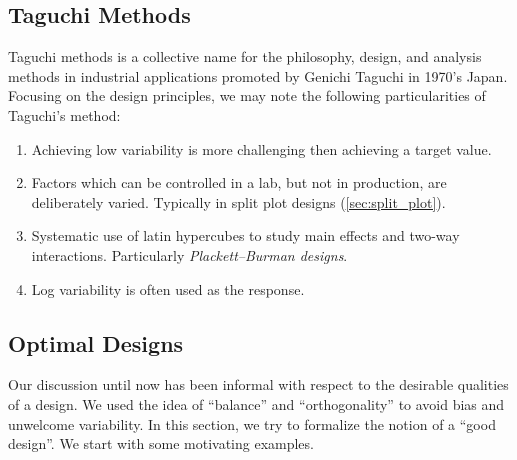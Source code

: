 \subsection{Taguchi Methods}
Taguchi methods is a collective name for the philosophy, design, and analysis methods in industrial applications promoted by Genichi Taguchi in 1970's Japan.
Focusing on the design principles, we may note the following particularities of Taguchi's method:
\begin{enumerate}
\item Achieving low variability is more challenging then achieving a target value. 
\item Factors which can be controlled in a lab, but not in production, are deliberately varied. Typically in split plot  designs (\ref{sec:split_plot}).
\item Systematic use of latin hypercubes to study main effects and two-way interactions. Particularly \emph{Plackett–Burman designs}.
\item Log variability is often used as the response.
\end{enumerate}





\subsection{Optimal Designs}


Our discussion until now has been informal with respect to the desirable qualities of a design. 
We used the idea of ``balance'' and ``orthogonality'' to avoid bias and unwelcome variability.
In this section, we try to formalize the notion of a ``good design''.
We start with some motivating examples.

